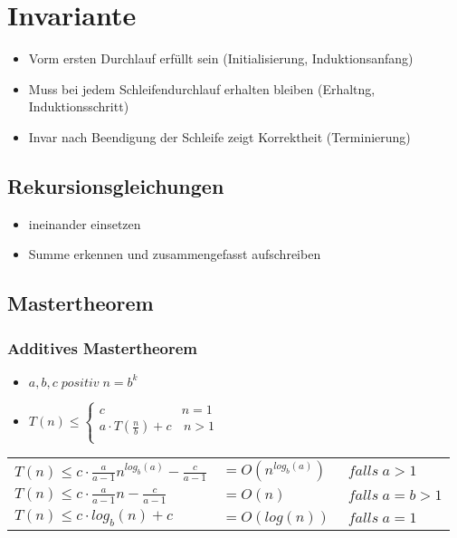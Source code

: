 \documentclass{article}
\begin{document}
\section{Invariante}
\begin{itemize}
\item Vorm ersten Durchlauf erfüllt sein (Initialisierung, Induktionsanfang)
\item Muss bei jedem Schleifendurchlauf erhalten bleiben (Erhaltng, Induktionsschritt)
\item Invar nach Beendigung der Schleife zeigt Korrektheit (Terminierung)
\end{itemize}


\subsection{Rekursionsgleichungen}
\begin{itemize}
\item ineinander einsetzen
\item Summe erkennen und zusammengefasst aufschreiben
\end{itemize}
\subsection{Mastertheorem}
\subsubsection{Additives Mastertheorem}
\begin{itemize}
\item $ a,b,c \; positiv \; n= b^k$
\item $T (n) \leq \left\{
\begin{array}{ll}
c & n  = 1 \\
a\cdot T(\frac{n}{b}) +c & \, n>1 \\
\end{array}
\right. $
\end{itemize}
\begin{tabular}{l l  l}

$T(n) \leq c\cdot \frac{a}{a-1}n^{log_b(a)} - \frac{c}{a-1}  $&$= O(n^{log_b(a)}) $&$ \; falls \; a>1$ \\
$T(n) \leq c\cdot \frac{a}{a-1}n - \frac{c}{a-1} $&$ = O(n)  $& $\; falls \; a=b>1$\\
$T(n) \leq c\cdot log_b(n) +c  $&$= O(log(n)) $&$\; falls \; a=1$\\
\end{tabular}
\end{document}
